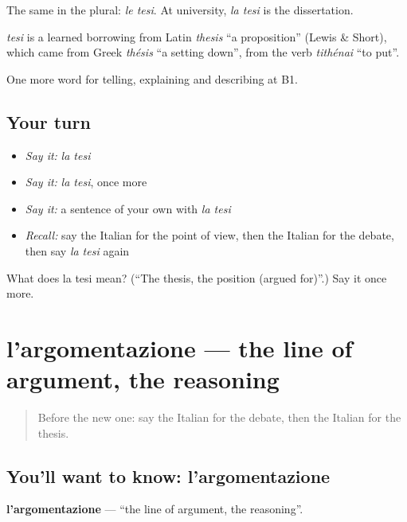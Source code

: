 The same in the plural: \emph{le tesi}. At university, \emph{la tesi} is the dissertation.

\begin{cousinweb}
\emph{tesi} is a learned borrowing from Latin \emph{thesis} \textquotedblleft{}a proposition\textquotedblright{} (Lewis \& Short), which came from Greek \emph{thésis} \textquotedblleft{}a setting down\textquotedblright{}, from the verb \emph{tithénai} \textquotedblleft{}to put\textquotedblright{}.
\end{cousinweb}

\begin{grammarlens}[title={What you've built}]
One more word for telling, explaining and describing at B1.
\end{grammarlens}

\subsection*{Your turn}
\begin{itemize}
\raggedright
  \item \emph{Say it:} \emph{la tesi}
  \item \emph{Say it:} \emph{la tesi}, once more
  \item \emph{Say it:} a sentence of your own with \emph{la tesi}
  \item \emph{Recall:} say the Italian for the point of view, then the Italian for the debate, then say \emph{la tesi} again
\end{itemize}

\begin{tcolorbox}[breakable,colback=teal!4,colframe=teal!35!black,title={Before you move on}]
What does la tesi mean? (\textquotedblleft{}The thesis, the position (argued for)\textquotedblright{}.) Say it once more.
\end{tcolorbox}
\section[l'argomentazione]{l'argomentazione — the line of argument, the reasoning}

\label{lesson:IT-C340-argomentazione}



\begin{quote}
Before the new one: say the Italian for the debate, then the Italian for the thesis.
\end{quote}

\subsection*{You'll want to know: l'argomentazione}
\textbf{l'argomentazione} — \textquotedblleft{}the line of argument, the reasoning\textquotedblright{}.

